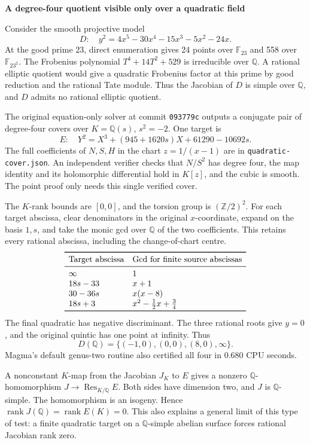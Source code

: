 \documentclass[12pt]{article}
\newcommand{\Q}{\mathbb Q}\newcommand{\Z}{\mathbb Z}
\newcommand{\heading}[1]{{\Large\bfseries\color{ink}#1}\par\vspace{3pt}}
\newcommand{\sub}[1]{\par\smallskip{\bfseries\color{green}#1}\par}
\begin{document}
\newpage
\heading{A degree-four quotient visible only over a quadratic field}
Consider the smooth projective model
\[
 D:\quad y^2=4x^5-30x^4-15x^3-5x^2-24x .
\]
At the good prime 23, direct enumeration gives 24 points over $\mathbb F_{23}$ and 558 over $\mathbb F_{23^2}$. The Frobenius polynomial $T^4+14T^2+529$ is irreducible over $\Q$. A rational elliptic quotient would give a quadratic Frobenius factor at this prime by good reduction and the rational Tate module. Thus the Jacobian of $D$ is simple over $\Q$, and $D$ admits no rational elliptic quotient.

The original equation-only solver at commit \texttt{093779c} outputs a conjugate pair of degree-four covers over $K=\Q(s)$, $s^2=-2$. One target is
\[
 E:\quad Y^2=X^3+(945+1620s)X+61290-10692s .
\]
The full coefficients of $N,S,H$ in the chart $z=1/(x-1)$ are in \texttt{quadratic-cover.json}. An independent verifier checks that $N/S^2$ has degree four, the map identity and its holomorphic differential hold in $K[z]$, and the cubic is smooth. The point proof only needs this single verified cover.

The $K$-rank bounds are $[0,0]$, and the torsion group is $(\Z/2)^2$. For each target abscissa, clear denominators in the original $x$-coordinate, expand on the basis $1,s$, and take the monic gcd over $\Q$ of the two coefficients. This retains every rational abscissa, including the change-of-chart centre.
\[
\begin{array}{ll}
\toprule
\text{Target abscissa}&\text{Gcd for finite source abscissas}\\\midrule
\infty & 1\\
18s-33 & x+1\\
30-36s & x(x-8)\\
18s+3 & x^2-\tfrac12x+\tfrac34\\
\bottomrule
\end{array}
\]
The final quadratic has negative discriminant. The three rational roots give $y=0$, and the original quintic has one point at infinity. Thus
\[
 D(\Q)=\{(-1,0),(0,0),(8,0),\infty\}.
\]
Magma's default genus-two routine also certified all four in 0.680 CPU seconds.

\sub{Why this test has Jacobian rank zero}
A nonconstant $K$-map from the Jacobian $J_K$ to $E$ gives a nonzero $\Q$-homomorphism $J\to\operatorname{Res}_{K/\Q} E$. Both sides have dimension two, and $J$ is $\Q$-simple. The homomorphism is an isogeny. Hence $\operatorname{rank}J(\Q)=\operatorname{rank}E(K)=0$. This also explains a general limit of this type of test: a finite quadratic target on a $\Q$-simple abelian surface forces rational Jacobian rank zero.
\end{document}
